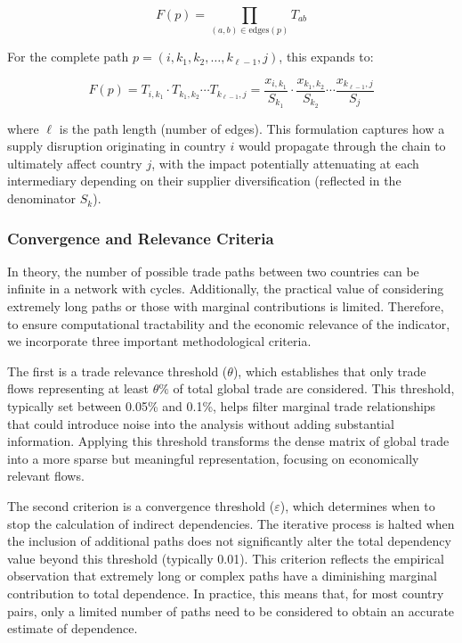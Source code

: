\documentclass[final,1p,times,authoryear]{elsarticle}
\begin{document}
\begin{equation}
F(p) = \prod_{(a,b) \in \text{edges}(p)} T_{ab}
\end{equation}

\noindent For the complete path $p = (i, k_1, k_2, \ldots, k_{\ell-1}, j)$, this expands to:

\begin{equation}
F(p) = T_{i,k_1} \cdot T_{k_1,k_2} \cdots T_{k_{\ell-1},j} = \frac{x_{i,k_1}}{S_{k_1}} \cdot \frac{x_{k_1,k_2}}{S_{k_2}} \cdots \frac{x_{k_{\ell-1},j}}{S_j}
\end{equation}

\noindent where $\ell$ is the path length (number of edges). This formulation captures how a supply disruption originating in country $i$ would propagate through the chain to ultimately affect country $j$, with the impact potentially attenuating at each intermediary depending on their supplier diversification (reflected in the denominator $S_k$).

\subsubsection{Convergence and Relevance Criteria}

In theory, the number of possible trade paths between two countries can be infinite in a network with cycles. Additionally, the practical value of considering extremely long paths or those with marginal contributions is limited. Therefore, to ensure computational tractability and the economic relevance of the indicator, we incorporate three important methodological criteria.

The first is a trade relevance threshold ($\theta$), which establishes that only trade flows representing at least $\theta\%$ of total global trade are considered. This threshold, typically set between 0.05\% and 0.1\%, helps filter marginal trade relationships that could introduce noise into the analysis without adding substantial information. Applying this threshold transforms the dense matrix of global trade into a more sparse but meaningful representation, focusing on economically relevant flows.

The second criterion is a convergence threshold ($\varepsilon$), which determines when to stop the calculation of indirect dependencies. The iterative process is halted when the inclusion of additional paths does not significantly alter the total dependency value beyond this threshold (typically 0.01). This criterion reflects the empirical observation that extremely long or complex paths have a diminishing marginal contribution to total dependence. In practice, this means that, for most country pairs, only a limited number of paths need to be considered to obtain an accurate estimate of dependence.
\end{document}
